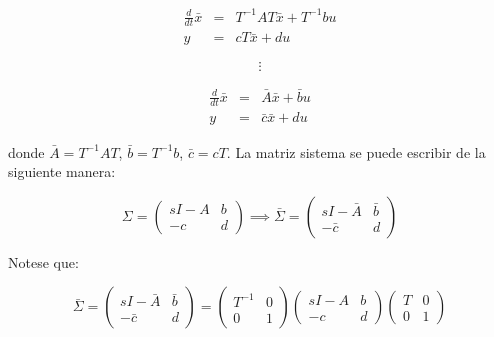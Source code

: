 \begin{enumerate}[i)]
\begin{enumerate}[a)]
                \begin{eqnarray}
                \frac{d}{dt} \bar{x} & = & T^{-1} A T \bar{x} + T^{-1} b u \nonumber \\
                y & = & c T \bar{x} + d u \nonumber
                \end{eqnarray}

                \begin{equation}
                    \vdots \nonumber
                \end{equation}

                \begin{eqnarray}
                \frac{d}{dt} \bar{x} & = & \bar{A} \bar{x} + \bar{b} u \nonumber \\
                y & = & \bar{c} \bar{x} + d u
                \end{eqnarray}

                donde $\bar{A} = T^{-1} A T$, $\bar{b} = T^{-1} b$, $\bar{c} = c T$. La matriz sistema se puede escribir de la siguiente manera:

                \begin{equation}
                    \Sigma =
                    \begin{pmatrix}
                    sI - A & b \\
                    -c & d
                    \end{pmatrix}
                    \implies
                    \bar{\Sigma} =
                    \begin{pmatrix}
                    sI - \bar{A} & \bar{b} \\
                    -\bar{c} & d
                    \end{pmatrix}
                \end{equation}

                Notese que:

                \begin{equation}
                    \bar{\Sigma} =
                    \begin{pmatrix}
                    sI - \bar{A} & \bar{b} \\
                    -\bar{c} & d
                    \end{pmatrix} =
                    \begin{pmatrix}
                    T^{-1} & 0 \\
                    0 & 1
                    \end{pmatrix}
                    \begin{pmatrix}
                    sI - A & b \\
                    -c & d
                    \end{pmatrix}
                    \begin{pmatrix}
                    T & 0 \\
                    0 & 1
                    \end{pmatrix} \nonumber
                \end{equation}


\end{enumerate}
\end{enumerate}
